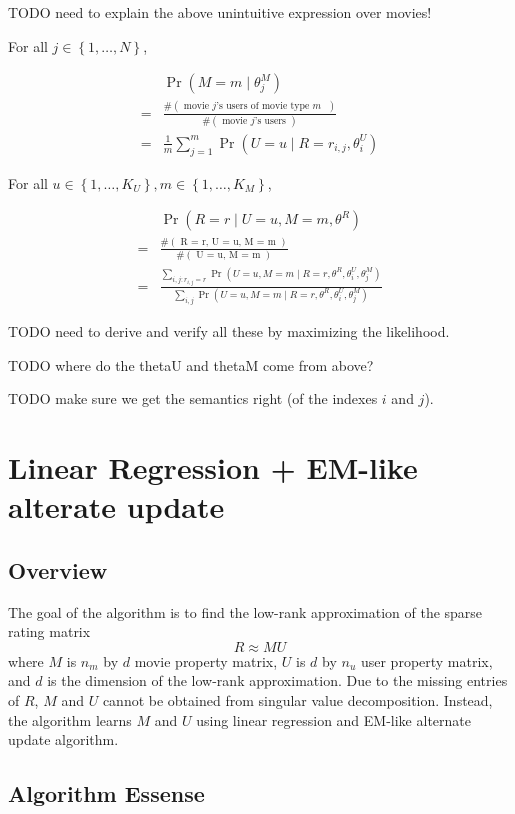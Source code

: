 \documentclass{article}
\newcommand{\PO}[1]{{ \Pr \left( #1 \right) }}
\newcommand{\PP}[2]{{ \PO{ #1 \mid #2 } }}
\newcommand{\N}[1]{{ \# \left( \textrm{ #1 } \right) }}
\newcommand{\range}[1]{{ \left\{ 1, \dots, #1 \right\} }}
\begin{document}
TODO need to explain the above unintuitive expression over movies!

For all $j \in \range{N}$,

\begin{align*}
  & \PP{ M = m }{ \theta^M_j } \\
  =& \frac{ \N{movie $j$'s users of movie type $m$} }{ \N{movie $j$'s users} } \\
  =& \frac{1}{m} \sum_{j=1}^m \PP{ U = u }{ R = r_{i,j}, \theta^U_i }
\end{align*}

For all $u \in \range{K_U}, m \in \range{K_M}$,

\begin{align*}
& \PP{ R = r }{ U = u, M = m, \theta^R } \\
=& \frac{
  \N{R = r, U = u, M = m}
}{
  \N{U = u, M = m}
} \\
=& \frac{
  \sum_{i,j: r_{i,j} = r}
  \PP{U = u, M = m}{R = r, \theta^R, \theta^U_i, \theta^M_j }
}{
  \sum_{i,j}
  \PP{U = u, M = m}{R = r, \theta^R, \theta^U_i, \theta^M_j }
}
\end{align*}

TODO need to derive and verify all these by maximizing the likelihood.

TODO where do the thetaU and thetaM come from above?

TODO make sure we get the semantics right (of the indexes $i$ and $j$).

\section{Linear Regression + EM-like alterate update}

\subsection{Overview}
The goal of the algorithm is to find the low-rank approximation of the sparse rating matrix
\begin{equation}
R \approx  MU
\end{equation}
where $M$ is $n_m$ by $d$ movie property matrix, $U$ is $d$ by $n_u$ user property matrix, and $d$ is the dimension of the low-rank approximation. Due to the missing entries of $R$, $M$ and $U$ cannot be obtained from singular value decomposition. Instead, the algorithm learns $M$ and $U$ using linear regression and EM-like alternate update algorithm.
\subsection{Algorithm Essense}
\end{document}
